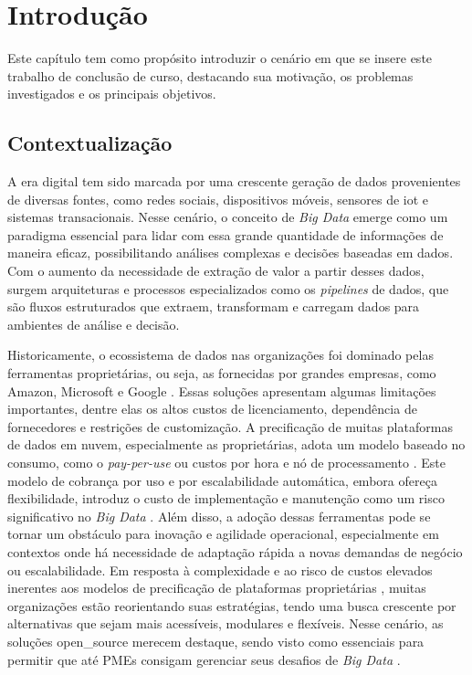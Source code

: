 \chapter{Introdução}
\label{sec:introducao}

Este capítulo tem como propósito introduzir o cenário em que se insere este trabalho de conclusão de curso, destacando sua motivação, os problemas investigados e os principais objetivos.

\section{Contextualização}

A era digital tem sido marcada por uma crescente geração de dados provenientes de diversas fontes, como redes sociais, dispositivos móveis, sensores de \ac{iot} e sistemas transacionais. Nesse cenário, o conceito de \textit{Big Data} emerge como um paradigma essencial para lidar com essa grande quantidade de informações de maneira eficaz, possibilitando análises complexas e decisões baseadas em dados. Com o aumento da necessidade de extração de valor a partir desses dados, surgem arquiteturas e processos especializados como os \textit{pipelines} de dados, que são fluxos estruturados que extraem, transformam e carregam dados para ambientes de análise e decisão.

Historicamente, o ecossistema de dados nas organizações foi dominado pelas ferramentas proprietárias, ou seja, as fornecidas por grandes empresas, como Amazon, Microsoft e Google \cite[]{septian2019, reverseetl2022}. Essas soluções apresentam algumas limitações importantes, dentre elas os altos custos de licenciamento, dependência de fornecedores e restrições de customização. A precificação de muitas plataformas de dados em nuvem, especialmente as proprietárias, adota um modelo baseado no consumo, como o \textit{pay-per-use} ou custos por hora e nó de processamento \cite[]{murarka2024}. Este modelo de cobrança por uso e por escalabilidade automática, embora ofereça flexibilidade, introduz o custo de implementação e manutenção como um risco significativo no \textit{Big Data} \cite[]{septian2019}. Além disso, a adoção dessas ferramentas pode se tornar um obstáculo para inovação e agilidade operacional, especialmente em contextos onde há necessidade de adaptação rápida a novas demandas de negócio ou escalabilidade. Em resposta à complexidade e ao risco de custos elevados inerentes aos modelos de precificação de plataformas proprietárias \cite[]{septian2019}, muitas organizações estão reorientando suas estratégias, tendo uma busca crescente por alternativas que sejam mais acessíveis, modulares e flexíveis. Nesse cenário, as soluções \ac{open_source} merecem destaque, sendo visto como essenciais para permitir que até \ac{PMEs} consigam gerenciar seus desafios de \textit{Big Data} \cite[]{septian2019, murarka2024}.

